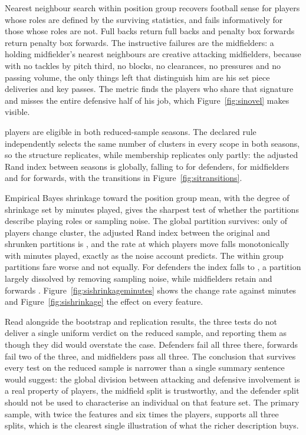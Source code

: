 Nearest neighbour search within position group recovers football sense for players whose roles
are defined by the surviving statistics, and fails informatively for those whose roles are not.
Full backs return full backs and penalty box forwards return penalty box forwards. The
instructive failures are the midfielders: a holding midfielder's nearest neighbours are creative
attacking midfielders, because with no tackles by pitch third, no blocks, no clearances, no
pressures and no passing volume, the only things left that distinguish him are his set piece
deliveries and key passes. The metric finds the players who share that signature and misses the
entire defensive half of his job, which Figure~\ref{fig:sinovel} makes visible.

\NCommonPlayers{} players are eligible in both reduced-sample seasons. The declared rule
independently selects the same number of clusters in every scope in both seasons, so the
structure replicates, while membership replicates only partly: the adjusted Rand index between
seasons is \CrossSeasonARIGlobal{} globally, falling to \CrossSeasonARIDF{} for defenders,
\CrossSeasonARIMF{} for midfielders and \CrossSeasonARIFW{} for forwards, with the transitions
in Figure~\ref{fig:sitransitions}.

Empirical Bayes shrinkage toward the position group mean, with the degree of shrinkage set by
minutes played, gives the sharpest test of whether the partitions describe playing roles or
sampling noise. The global partition survives: only \ShrinkChangedGlobal{} of
\NEligiblePrimary{} players change cluster, the adjusted Rand index between the original and
shrunken partitions is \ShrinkARIGlobal{}, and the rate at which players move falls
monotonically with minutes played, exactly as the noise account predicts. The within group
partitions fare worse and not equally. For defenders the index falls to \ShrinkARIDF{}, a
partition largely dissolved by removing sampling noise, while midfielders retain
\ShrinkARIMF{} and forwards \ShrinkARIFW{}. Figure~\ref{fig:sishrinkageminutes} shows the
change rate against minutes and Figure~\ref{fig:sishrinkage} the effect on every feature.

Read alongside the bootstrap and replication results, the three tests do not deliver a single
uniform verdict on the reduced sample, and reporting them as though they did would overstate the
case. Defenders fail all three there, forwards fail two of the three, and midfielders pass all
three. The conclusion that survives every test on the reduced sample is narrower than a single
summary sentence would suggest: the global division between attacking and defensive involvement
is a real property of players, the midfield split is trustworthy, and the defender split should
not be used to characterise an individual on that feature set. The primary sample, with twice
the features and six times the players, supports all three splits, which is the clearest single
illustration of what the richer description buys.

